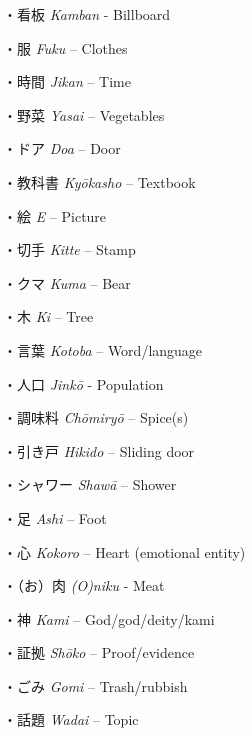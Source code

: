 \par{・看板 \emph{Kamban }- Billboard }

\par{・服 \emph{Fuku }– Clothes }

\par{・時間 \emph{Jikan }– Time }

\par{・野菜 \emph{Yasai }– Vegetables }

\par{・ドア \emph{Doa }– Door }

\par{・教科書 \emph{Kyōkasho }– Textbook }

\par{・絵 \emph{E }– Picture }

\par{・切手 \emph{Kitte }– Stamp }

\par{・クマ \emph{Kuma }– Bear }

\par{・木 \emph{Ki }– Tree }

\par{・言葉 \emph{Kotoba }– Word\slash language }

\par{・人口 \emph{Jinkō }- Population }

\par{・調味料 \emph{Chōmiryō }– Spice(s) }

\par{・引き戸 \emph{Hikido }– Sliding door }

\par{・シャワー \emph{Shawā }– Shower }

\par{・足 \emph{Ashi }– Foot }

\par{・心 \emph{Kokoro }– Heart (emotional entity) }

\par{・（お）肉 \emph{(O)niku }- Meat }

\par{・神 \emph{Kami }– God\slash god\slash deity\slash kami }

\par{・証拠 \emph{Shōko }– Proof\slash evidence }

\par{・ごみ \emph{Gomi }– Trash\slash rubbish }

\par{・話題 \emph{Wadai }– Topic }

